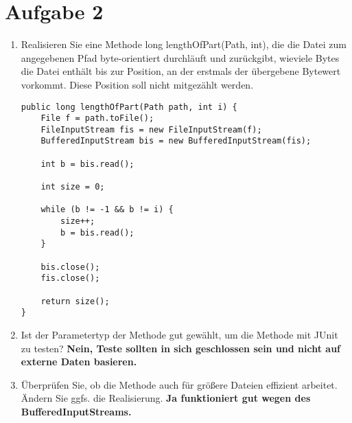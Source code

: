 \section{Aufgabe 2}
\begin{enumerate}
    \item Realisieren Sie eine Methode long lengthOfPart(Path, int), die die Datei zum
          angegebenen Pfad byte-orientiert durchläuft und zurückgibt, wieviele Bytes
          die Datei enthält bis zur Position, an der erstmals der übergebene Bytewert
          vorkommt. Diese Position soll nicht mitgezählt werden.
          \begin{lstlisting}
public long lengthOfPart(Path path, int i) {
    File f = path.toFile();
    FileInputStream fis = new FileInputStream(f);
    BufferedInputStream bis = new BufferedInputStream(fis);

    int b = bis.read();
    
    int size = 0;

    while (b != -1 && b != i) {
        size++;
        b = bis.read();
    }

    bis.close();
    fis.close();

    return size();
}
\end{lstlisting}
    \item Ist der Parametertyp der Methode gut gewählt, um die Methode mit JUnit zu
          testen? \newline 
          \textbf{Nein, Teste sollten in sich geschlossen sein und nicht auf externe Daten basieren.}
    \item Überprüfen Sie, ob die Methode auch für größere Dateien effizient arbeitet. Ändern Sie ggfs.
          die Realisierung. \newline \textbf{Ja funktioniert gut wegen des BufferedInputStreams.}
\end{enumerate}
